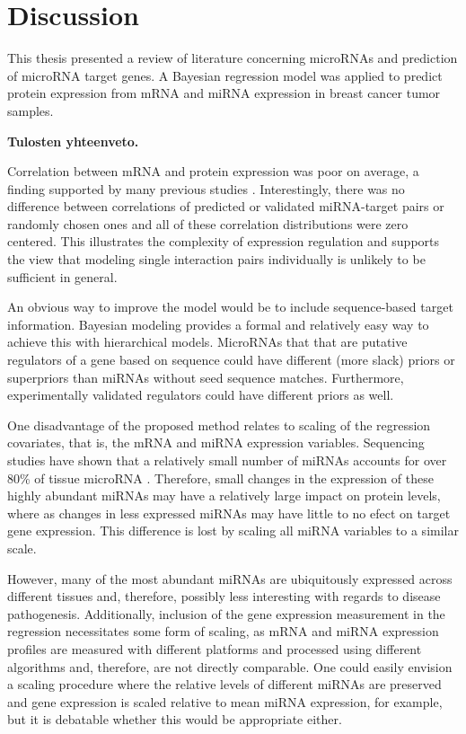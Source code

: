 

\section{Discussion}

This thesis presented a review of literature concerning microRNAs and
prediction of microRNA target genes. A Bayesian regression model was applied
to predict protein expression from mRNA and miRNA expression in breast cancer
tumor samples.

\textbf{Tulosten yhteenveto.}

Correlation between mRNA and protein expression was poor on average, a finding
supported by many previous studies \citep{Payne2015}. Interestingly,
there was no difference between correlations of predicted or validated
miRNA-target pairs or randomly chosen ones and all of these correlation
distributions were zero centered. This illustrates the
complexity of expression regulation and supports the view that modeling
single interaction pairs individually is unlikely to be sufficient in
general.

An obvious way to improve the model would be to include sequence-based target
information. Bayesian modeling provides a formal and relatively easy way to
achieve this with hierarchical models. MicroRNAs that that are putative
regulators of a gene based on sequence could have different (more slack)
priors or superpriors than miRNAs without seed sequence matches. Furthermore,
experimentally validated regulators could have different priors as well.

One disadvantage of the proposed method relates to scaling of the regression
covariates, that is, the mRNA and miRNA expression variables. Sequencing studies have shown
that a relatively small number of miRNAs accounts for over 80\% of tissue microRNA
\citep{Landgraf2007}. Therefore, small changes in the expression of these highly
abundant miRNAs may have a relatively large impact on protein levels, where as
changes in less expressed miRNAs may have little to no efect on target gene
expression. This difference is lost by scaling all miRNA variables to a similar scale.

However, many of the most abundant miRNAs are ubiquitously expressed across
different tissues \citep{Landgraf2007} and, therefore, possibly less
interesting with regards to disease pathogenesis. Additionally, inclusion of
the gene expression measurement in the regression necessitates some form of
scaling, as mRNA and miRNA expression profiles are measured with different platforms
and processed using different algorithms and, therefore, are not directly
comparable. One could easily envision a scaling procedure where the relative
levels of different miRNAs are preserved and gene expression is scaled
relative to mean miRNA expression, for example, but it is debatable whether
this would be appropriate either.

